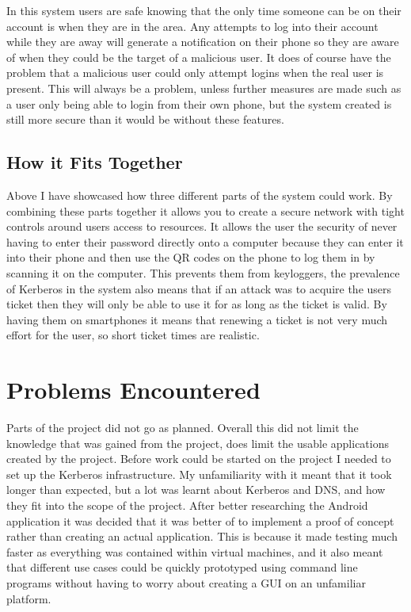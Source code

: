\documentclass[]{report}   %
\begin{document}
In this system users are safe knowing that the only time someone can be on their account is when they are in the area. Any attempts to log into their account while they are away will generate a notification on their phone so they are aware of when they could be the target of a malicious user. It does of course have the problem that a malicious user could only attempt logins when the real user is present. This will always be a problem, unless further measures are made such as a user only being able to login from their own phone, but the system created is still more secure than it would be without these features.

\subsection{How it Fits Together}

Above I have showcased how three different parts of the system could work. By combining these parts together it allows you to create a secure network with tight controls around users access to resources. It allows the user the security of never having to enter their password directly onto a computer because they can enter it into their phone and then use the QR codes on the phone to log them in by scanning it on the computer. This prevents them from keyloggers, the prevalence of Kerberos in the system also means that if an attack was to acquire the users ticket then they will only be able to use it for as long as the ticket is valid. By having them on smartphones it means that renewing a ticket is not very much effort for the user, so short ticket times are realistic.



\section{Problems Encountered}
Parts of the project did not go as planned. Overall this did not limit the knowledge that was gained from the project, does limit the usable applications created by the project. Before work could be started on the project I needed to set up the Kerberos infrastructure. My unfamiliarity with it meant that it took longer than expected, but a lot was learnt about Kerberos and DNS, and how they fit into the scope of the project. After better researching the Android application it was decided that it was better of to implement a proof of concept rather than creating an actual application. This is because it made testing much faster as everything was contained within virtual machines, and it also meant that different use cases could be quickly prototyped using command line programs without having to worry about creating a GUI on an unfamiliar platform.
\end{document}
